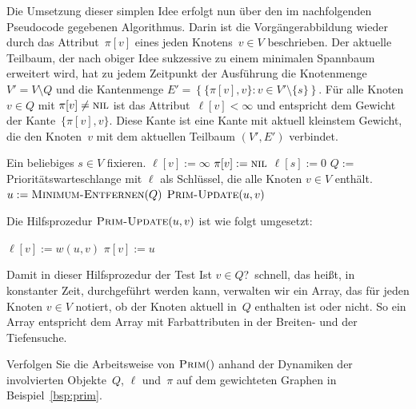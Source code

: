 \begin{bem}
Die Umsetzung dieser simplen Idee erfolgt nun über den im nachfolgenden Pseudocode gegebenen Algorithmus.
Darin ist die Vorgängerabbildung wieder durch das Attribut~$\pi[v]$ eines jeden Knotens~$v \in V$ beschrieben.
Der aktuelle Teilbaum, der nach obiger Idee sukzessive zu einem minimalen Spannbaum erweitert wird, hat zu jedem Zeitpunkt der Ausführung die Knotenmenge $V' = V \setminus Q$ und die Kantenmenge $E' = \left\{\{\pi[v],v\} : v \in V' \setminus \{s\}\right\}$.
Für alle Knoten~$v \in Q$ mit $\pi[v] \neq \mathop{\text{\textsc{nil}}}$ ist das Attribut~$\ell[v] < \infty$ und entspricht dem Gewicht der Kante~$\{\pi[v],v\}$.
Diese Kante ist eine Kante mit aktuell kleinstem Gewicht, die den Knoten~$v$ mit dem aktuellen Teilbaum $(V',E')$ verbindet.

\begin{algorithm}[H]
\caption{$\cc{Prim}(G)$}
\begin{algorithmic}[1]
 \STATE Ein beliebiges $s \in V$ fixieren.
 \STATE{}
  \STATE $\ell[v] := \infty$
  \STATE $\pi[v] := \mathop{\text{\textsc{nil}}}$
 \ENDFOR
 \STATE $\ell[s] := 0$
 \STATE $Q := $ Prioritätswarteschlange mit $\ell$ als Schlüssel, die alle Knoten $v \in V$ enthält.
 \STATE{}
  \STATE $u := \mathop{\text{\textsc{Minimum-Entfernen}}}(Q)$ 
   \STATE $\cc{Prim-Update}(u,v)$
  \ENDFOR
 \ENDWHILE
\end{algorithmic}
\end{algorithm}

Die Hilfsprozedur $\cc{Prim-Update}(u,v)$ ist wie folgt umgesetzt:

\begin{algorithm}[H]
	\caption{$\cc{Prim-Update}(u,v)$}
	\begin{algorithmic}[1]
		\STATE $\ell[v]:=w(u,v)$
		\STATE $\pi[v] := u$
		\ENDIF
	\end{algorithmic}
\end{algorithm}

Damit in dieser Hilfsprozedur der Test \glqq Ist $v \in Q$?\grqq\ schnell, das heißt, in konstanter Zeit, durchgeführt werden kann, verwalten wir ein Array, das für jeden Knoten $v \in V$ notiert, ob der Knoten aktuell in~$Q$ enthalten ist oder nicht. So ein Array entspricht dem Array mit Farbattributen in der Breiten- und der Tiefensuche. 
\end{bem}

\begin{aufg}
Verfolgen Sie die Arbeitsweise von $\mathop{\text{\textsc{Prim}}}()$ anhand der Dynamiken der involvierten Objekte~$Q$, $\ell$ und~$\pi$ auf dem gewichteten Graphen in Beispiel~\ref{bsp:prim}.
\end{aufg}

